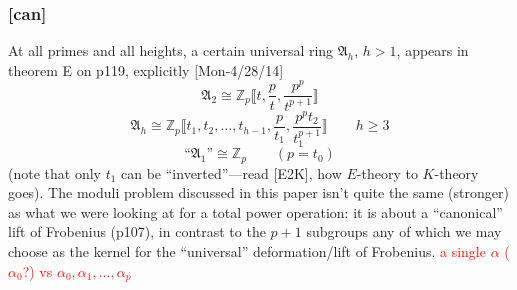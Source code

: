\documentclass{rs}
\theoremstyle{definition}
\theoremstyle{remark}
\newcommand{\mb}[1]{\mathbb{#1}}
\newcommand{\mf}[1]{\mathfrak{#1}}
\newcommand{\BZ}{{\mb Z}}
\newcommand{\A}{\alpha}
\renewcommand{\=}{\approx}
\renewcommand{\-}{\sim}
\numberwithin{equation}{section}
\numberwithin{thm}{section}
\begin{document}
\subsubsection{[can]}
\label{subsubsec:can}

At all primes and all heights, a certain universal ring $\mf A_h$, $h > 1$, appears in theorem E on p119, explicitly [Mon-4/28/14] 
\[
 {\mf A_2} \cong \BZ_p \llbracket t, \frac{p}{t}, \frac{p^p}{t^{p+1}} \rrbracket 
\]
\[
 {\mf A_h} \cong \BZ_p \llbracket t_1, t_2, \ldots, t_{h-1}, \frac{p}{t_1}, \frac{p^p t_2}{t_1^{p+1}} \rrbracket \qquad h \geq 3 
\]
\[
 \text{``${\mf A_1}$''} \cong \BZ_p \qquad (p = t_0) 
\]
(note that only $t_1$ can be ``inverted''---read [E2K], how $E$-theory to $K$-theory goes).  
The moduli problem discussed in this paper isn't quite the same (stronger) as what we were looking at for a total power operation: 
it is about a ``canonical'' lift of Frobenius (p107), 
in contrast to the $p+1$ subgroups any of which we may choose as the kernel for the ``universal'' deformation/lift of Frobenius.  
\textcolor{red}{a single $\A$ ($\A_0$?) vs $\A_0, \A_1, \ldots, \A_p$} 
\end{document}
